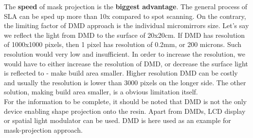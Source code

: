 \documentclass[a4paper, twoside, 11pt]{report}
\begin{document}
%
The \textbf{speed} of mask projection is the \textbf{biggest advantage}. The general process of SLA can be sped up more than 10x compared to spot scanning. On the contrary, the limiting factor of DMD approach is the individual micromirrors size. Let's say we reflect the light from DMD to the surface of 20x20cm. If DMD has resolution of 1000x1000 pixels, then 1 pixel has resolution of 0.2mm, or 200 microns. Such resolution would very low and insufficient. In order to increase the resolution, we would have to either increase the resolution of DMD, or decrease the surface light is reflected to - make build area smaller. Higher resolution DMD can be costly and usually the resolution is lower than 3000 pixels on the longer side. The other solution, making build area smaller, is a obvious limitation itself.\\
For the information to be complete, it should be noted that DMD is not the only device enabling shape projection onto the resin. Apart from DMDs, LCD display or spatial light modulator can be used. DMD is here used as an example for mask-projection approach.\\
%
\end{document}
